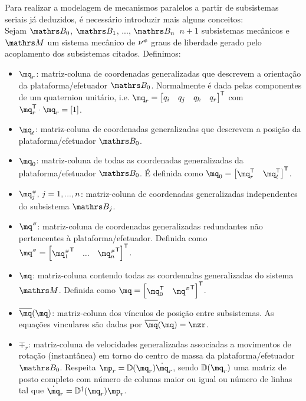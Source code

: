 \documentclass[a4paper,11pt,brazil,fleqn]{article}
\begin{document}
Para realizar a modelagem de mecanismos paralelos a partir de subsistemas seriais j\'a deduzidos, \'e necess\'ario introduzir mais alguns conceitos: \\

Sejam $\ssB_0$, $\ssB_1$, ..., $\ssB_{n} \,$ $n+1$ subsistemas mec\^anicos e $\ssM$ um sistema mec\^anico de $\nu^{\scriptscriptstyle \#}$ graus de liberdade gerado pelo acoplamento dos subsistemas citados. Definimos:

\begin{itemize}
\item $\mq_r$: matriz-coluna de coordenadas generalizadas que descrevem a orienta\c{c}\~ao da plataforma/efetuador $\ssB_0$. Normalmente \'e dada pelas componentes de um quaternion unit\'ario, i.e. $\mq_r = \begin{bmatrix} q_i & q_j & q_k & q_r \end{bmatrix}^\msT $ com $ \mq_r^\msT \cdot \mq_r = \vct{1}$.
\item $\mq_t$: matriz-coluna de coordenadas generalizadas que descrevem a posi\c{c}\~ao da plataforma/efetuador $\ssB_0$.
\item $\mq_0$: matriz-coluna de todas as coordenadas generalizadas da plataforma/efetuador $\ssB_0$. \'E definida como $\mq_0 = \begin{bmatrix} \mq_r^\msT & \mq_t^\msT \end{bmatrix}^\msT$.
\item $\mq_j\ssh, \,j=1, ..., n$: matriz-coluna de coordenadas generalizadas independentes do subsistema  $\ssB_j$.
\item $\mq\hcir$: matriz-coluna de coordenadas generalizadas redundantes n\~ao pertencentes \`a plataforma/efetuador. Definida como $\mq\hcir = \begin{bmatrix}  {\mq_1\ssh}^\msT & ... & {\mq_{n}\ssh}^\msT \end{bmatrix}^\msT $.
\item $\mq$: matriz-coluna contendo todas as coordenadas generalizadas do sistema $\ssM$. Definida como $\mq = \begin{bmatrix} \mq_0^\msT & {\mq\hcir}^\msT \end{bmatrix}^\msT $.
\item $\overline{\mq}(\mq)$: matriz-coluna dos v\'inculos de posi\c{c}\~ao entre subsistemas. As equa\c{c}\~oes vinculares s\~ao dadas por $\overline{\mq}(\mq) = \mzr $.
\item $\mp_r$: matriz-coluna de velocidades generalizadas associadas a movimentos de rota\c{c}\~ao (instant\^anea) em torno do centro de massa da plataforma/efetuador $\ssB_0$. Respeita $\mp_r = \mD(\mq_r)\dot{\mq}_r$, sendo $\mD(\mq_r)$ uma matriz de posto completo com n\'umero de colunas maior ou igual ou n\'umero de linhas tal que $\dot{\mq}_r  = \mD^\msP(\mq_r) \mp_r$.

\end{itemize}
\end{document}
